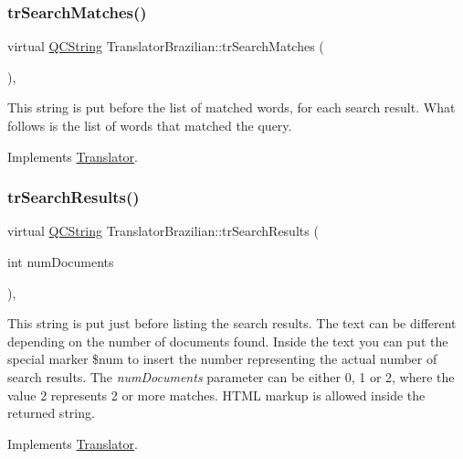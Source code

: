 \subsubsection{\texorpdfstring{trSearchMatches()}{trSearchMatches()}}
{\footnotesize\ttfamily virtual \mbox{\hyperlink{class_q_c_string}{Q\+C\+String}} Translator\+Brazilian\+::tr\+Search\+Matches (\begin{DoxyParamCaption}{ }\end{DoxyParamCaption})\hspace{0.3cm}{\ttfamily [inline]}, {\ttfamily [virtual]}}

This string is put before the list of matched words, for each search result. What follows is the list of words that matched the query. 

Implements \mbox{\hyperlink{class_translator}{Translator}}.

\mbox{\label{class_translator_brazilian_ae5d3b7948b755badb7519eeb5e976fdb}} 
\subsubsection{\texorpdfstring{trSearchResults()}{trSearchResults()}}
{\footnotesize\ttfamily virtual \mbox{\hyperlink{class_q_c_string}{Q\+C\+String}} Translator\+Brazilian\+::tr\+Search\+Results (\begin{DoxyParamCaption}\item[{int}]{num\+Documents }\end{DoxyParamCaption})\hspace{0.3cm}{\ttfamily [inline]}, {\ttfamily [virtual]}}

This string is put just before listing the search results. The text can be different depending on the number of documents found. Inside the text you can put the special marker \$num to insert the number representing the actual number of search results. The {\itshape num\+Documents} parameter can be either 0, 1 or 2, where the value 2 represents 2 or more matches. H\+T\+ML markup is allowed inside the returned string. 

Implements \mbox{\hyperlink{class_translator}{Translator}}.

\mbox{\label{class_translator_brazilian_aa912d7fbf21a79b24520d867f6cb2323}} 
